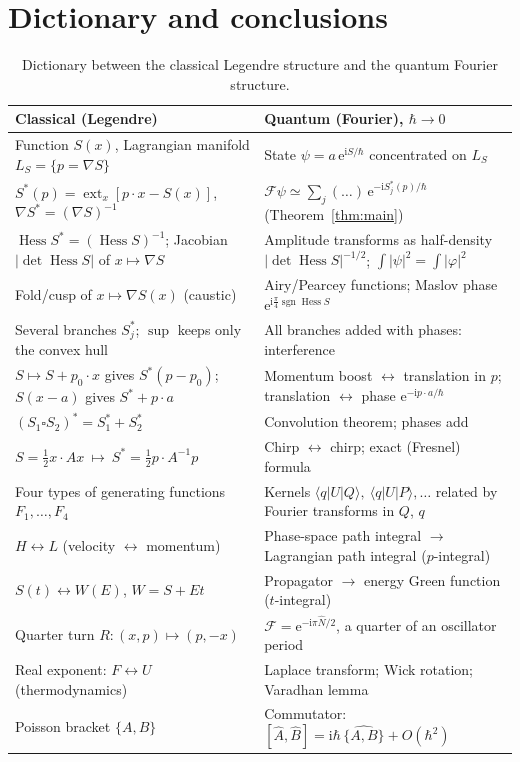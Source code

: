 \documentclass[11pt,a4paper]{article}
\newcommand{\ii}{\mathrm{i}}
\newcommand{\ee}{\mathrm{e}}
\newcommand{\hb}{\hbar}
\newcommand{\op}[1]{\hat{#1}}
\newcommand{\sgn}{\operatorname{sgn}}
\newcommand{\Hess}{\operatorname{Hess}}
\newcommand{\ext}{\operatorname*{ext}}
\newcommand{\Pois}[2]{\{#1,#2\}}
\newcommand{\bra}[1]{\langle #1|}
\newcommand{\ket}[1]{|#1\rangle}
\newcommand{\FT}{\mathcal{F}}
\theoremstyle{plain}
\theoremstyle{definition}
\theoremstyle{remark}
\begin{document}
\section{Dictionary and conclusions}\label{sec:dictionary}

\begin{table}[ht]
\centering
\renewcommand{\arraystretch}{1.25}
\begin{tabular}{>{\raggedright\arraybackslash}p{}>{\raggedright\arraybackslash}p{}}
\toprule
\textbf{Classical (Legendre)} & \textbf{Quantum (Fourier), $\hb\to0$}\\
\midrule
Function $S(x)$, Lagrangian manifold $L_S=\{p=\nabla S\}$ & State $\psi=a\,\ee^{\ii S/\hb}$ concentrated on $L_S$\\
$S^*(p)=\ext_x[p\cdot x-S(x)]$, $\nabla S^*=(\nabla S)^{-1}$ & $\FT\psi\simeq\sum_j(\dots)\,\ee^{-\ii S_j^*(p)/\hb}$ (Theorem~\ref{thm:main})\\
$\Hess S^*=(\Hess S)^{-1}$; Jacobian $|\det\Hess S|$ of $x\mapsto\nabla S$ & Amplitude transforms as half-density $|\det\Hess S|^{-1/2}$; $\int|\psi|^2=\int|\varphi|^2$\\
Fold/cusp of $x\mapsto\nabla S(x)$ (caustic) & Airy/Pearcey functions; Maslov phase $\ee^{\ii\frac\pi4\sgn\Hess S}$\\
Several branches $S^*_j$; $\sup$ keeps only the convex hull & All branches added with phases: interference\\
$S\mapsto S+p_0\cdot x$ gives $S^*(p-p_0)$; $S(x-a)$ gives $S^*+p\cdot a$ & Momentum boost $\leftrightarrow$ translation in $p$; translation $\leftrightarrow$ phase $\ee^{-\ii p\cdot a/\hb}$\\
$(S_1\square S_2)^*=S_1^*+S_2^*$ & Convolution theorem; phases add\\
$S=\tfrac12x\cdot Ax\ \mapsto\ S^*=\tfrac12p\cdot A^{-1}p$ & Chirp $\leftrightarrow$ chirp; exact (Fresnel) formula\\
Four types of generating functions $F_1,\dots,F_4$ & Kernels $\bra q U\ket Q,\ \bra q U\ket P,\dots$ related by Fourier transforms in $Q$, $q$\\
$H\leftrightarrow L$ (velocity $\leftrightarrow$ momentum) & Phase-space path integral $\to$ Lagrangian path integral ($p$-integral)\\
$S(t)\leftrightarrow W(E)$, $W=S+Et$ & Propagator $\to$ energy Green function ($t$-integral)\\
Quarter turn $R:(x,p)\mapsto(p,-x)$ & $\FT=\ee^{-\ii\pi\op N/2}$, a quarter of an oscillator period\\
Real exponent: $F\leftrightarrow U$ (thermodynamics) & Laplace transform; Wick rotation; Varadhan lemma\\
Poisson bracket $\Pois AB$ & Commutator: $[\op A,\op B]=\ii\hb\,\widehat{\Pois AB}+O(\hb^2)$\\
\bottomrule
\end{tabular}
\caption{Dictionary between the classical Legendre structure and the quantum Fourier structure.}\label{tab:dictionary}
\end{table}
\end{document}
